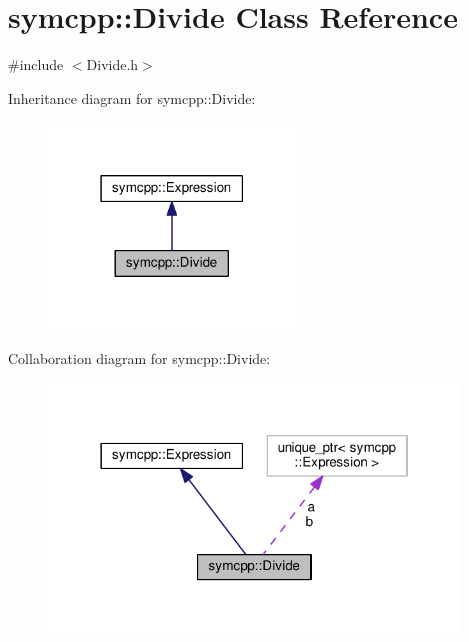 \hypertarget{classsymcpp_1_1Divide}{}\section{symcpp\+:\+:Divide Class Reference}
\label{classsymcpp_1_1Divide}


{\ttfamily \#include $<$Divide.\+h$>$}



Inheritance diagram for symcpp\+:\+:Divide\+:\nopagebreak
\begin{figure}[H]
\begin{center}
\leavevmode
\includegraphics[width=186pt]{classsymcpp_1_1Divide__inherit__graph}
\end{center}
\end{figure}


Collaboration diagram for symcpp\+:\+:Divide\+:\nopagebreak
\begin{figure}[H]
\begin{center}
\leavevmode
\includegraphics[width=310pt]{classsymcpp_1_1Divide__coll__graph}
\end{center}
\end{figure}
